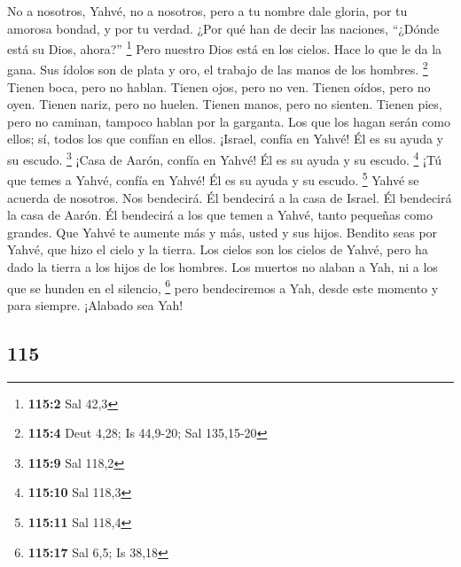 \begin{paracol}{2}
 No a nosotros, Yahvé, no a nosotros, pero a tu nombre
dale gloria, por tu amorosa bondad, y por tu verdad.  ¿Por
qué han de decir las naciones, ``¿Dónde está su Dios, ahora?''
\footnote{\textbf{115:2} Sal 42,3}  Pero nuestro Dios está
en los cielos. Hace lo que le da la gana.  Sus ídolos son
de plata y oro, el trabajo de las manos de los hombres. \footnote{\textbf{115:4}
  Deut 4,28; Is 44,9-20; Sal 135,15-20}  Tienen boca, pero
no hablan. Tienen ojos, pero no ven.  Tienen oídos, pero
no oyen. Tienen nariz, pero no huelen.  Tienen manos, pero
no sienten. Tienen pies, pero no caminan, tampoco hablan por la
garganta.  Los que los hagan serán como ellos; sí, todos
los que confían en ellos.  ¡Israel, confía en Yahvé! Él es
su ayuda y su escudo. \footnote{\textbf{115:9} Sal 118,2}
 ¡Casa de Aarón, confía en Yahvé! Él es su ayuda y su
escudo. \footnote{\textbf{115:10} Sal 118,3}  ¡Tú que
temes a Yahvé, confía en Yahvé! Él es su ayuda y su escudo. \footnote{\textbf{115:11}
  Sal 118,4}  Yahvé se acuerda de nosotros. Nos
bendecirá. Él bendecirá a la casa de Israel. Él bendecirá la casa de
Aarón.  Él bendecirá a los que temen a Yahvé, tanto
pequeñas como grandes.  Que Yahvé te aumente más y más,
usted y sus hijos.  Bendito seas por Yahvé, que hizo el
cielo y la tierra.  Los cielos son los cielos de Yahvé,
pero ha dado la tierra a los hijos de los hombres.  Los
muertos no alaban a Yah, ni a los que se hunden en el silencio,
\footnote{\textbf{115:17} Sal 6,5; Is 38,18}  pero
bendeciremos a Yah, desde este momento y para siempre. ¡Alabado sea Yah!

\switchcolumn
\begin{otherlanguage}{english}

\hypertarget{section-229}{%
\section{115}\label{section-229}}


\end{otherlanguage}
\end{paracol}
